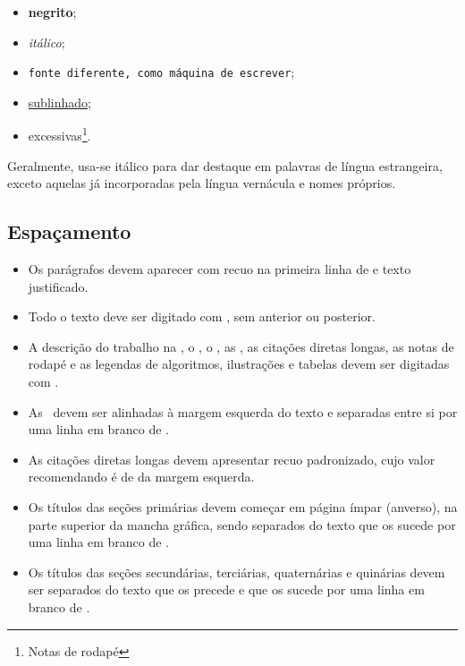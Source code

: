 \begin{itemize}
\item \textbf{negrito};
\item \textit{itálico};
\item \texttt{fonte diferente, como máquina de escrever};
\item \uline{sublinhado};
\item excessivas\footnote{Notas de rodapé}.
\end{itemize}

\noindent Geralmente, usa-se itálico para dar destaque em palavras de língua estrangeira, exceto aquelas já incorporadas pela língua vernácula e nomes próprios.

\subsection{Espaçamento}%
\label{ssect:spcng}

\begin{itemize}
\item Os parágrafos devem aparecer com recuo na primeira linha de  e texto justificado.
\item Todo o texto deve ser digitado com   , sem  anterior ou posterior.
\item A descrição do trabalho na \ttlpgref, o \resref, o \absref, as , as citações diretas longas, as notas de rodapé e as legendas de algoritmos, ilustrações e tabelas devem ser digitadas com   .
\item As \ devem ser alinhadas à margem esquerda do texto e separadas entre si por uma linha em branco de  .
\item As citações diretas longas devem apresentar recuo padronizado, cujo valor recomendando é de  da margem esquerda.
\item Os títulos das seções primárias devem começar em página ímpar (anverso), na parte superior da mancha gráfica, sendo separados do texto que os sucede por uma linha em branco de  .
\item Os títulos das seções secundárias, terciárias, quaternárias e quinárias devem ser separados do texto que os precede e que os sucede por uma linha em branco de  .
\end{itemize}

